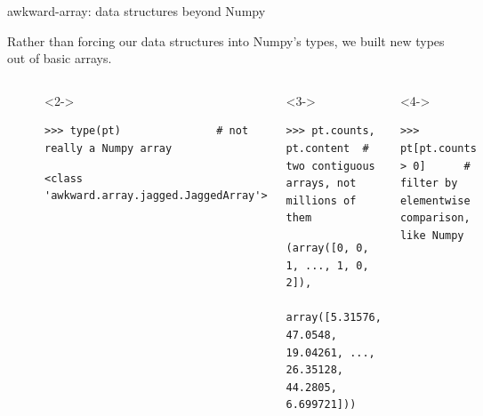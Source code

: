 \documentclass[aspectratio=169]{beamer}
\begin{document}
\begin{frame}[fragile]{awkward-array: data structures beyond Numpy}
\large
\vspace{0.25 cm}

Rather than forcing our data structures into Numpy's types, we built new types out of basic arrays.

\begin{columns}
\small
\begin{verbatim}
>>> pt = uproot.open("cms-nanoaod.root")["Events"].array("Muon_pt")
>>> pt
\end{verbatim}

\vspace{-0.6 cm}
\color{darkblue}\begin{verbatim}
<JaggedArray [[] [] [5.315762] ... [26.351288] [] [44.28051 6.6997213]]>
\end{verbatim}
\color{black}

\begin{uncoverenv}<2->
\vspace{-0.6 cm}
\begin{verbatim}
>>> type(pt)               # not really a Numpy array
\end{verbatim}

\vspace{-0.6 cm}
\color{darkblue}\begin{verbatim}
<class 'awkward.array.jagged.JaggedArray'>
\end{verbatim}
\color{black}
\end{uncoverenv}

\begin{uncoverenv}<3->
\vspace{-0.6 cm}
\begin{verbatim}
>>> pt.counts, pt.content  # two contiguous arrays, not millions of them
\end{verbatim}

\vspace{-0.6 cm}
\color{darkblue}\begin{verbatim}
(array([0, 0, 1, ..., 1, 0, 2]),
 array([5.31576, 47.0548, 19.04261, ..., 26.35128, 44.2805, 6.699721]))
\end{verbatim}
\color{black}
\end{uncoverenv}

\begin{uncoverenv}<4->
\vspace{-0.6 cm}
\begin{verbatim}
>>> pt[pt.counts > 0]      # filter by elementwise comparison, like Numpy
\end{verbatim}


\end{uncoverenv}
\end{columns}
\end{frame}
\end{document}
